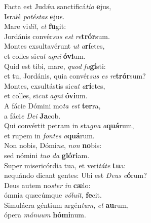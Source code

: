 \evenverse Facta est Judǽa sanctificá\textit{ti}\textit{o} \textbf{e}jus,~\*\\
\evenverse Israël \textit{po}\textit{té}\textit{stas} \textbf{e}jus.\\
\oddverse Mare vi\textit{dit}, \textit{et} \textbf{fu}git:~\*\\
\oddverse Jordánis convér\textit{sus} \textit{est} \textit{re}\textbf{trór}sum.\\
\evenverse Montes exsultavérunt \textit{ut} \textit{a}\textbf{rí}etes,~\*\\
\evenverse et colles si\textit{cut} \textit{a}\textit{gni} \textbf{ó}\textbf{vi}um.\\
\oddverse Quid est tibi, mare, \textit{quod} \textit{fu}\textbf{gí}sti:~\*\\
\oddverse et tu, Jordánis, quia convér\textit{sus} \textit{es} \textit{re}\textbf{trór}sum?\\
\evenverse Montes, exsultástis si\textit{cut} \textit{a}\textbf{rí}etes,~\*\\
\evenverse et colles, si\textit{cut} \textit{a}\textit{gni} \textbf{ó}\textbf{vi}um.\\
\oddverse A fácie Dómini mo\textit{ta} \textit{est} \textbf{ter}ra,~\*\\
\oddverse a fáci\textit{e} \textit{De}\textit{i} \textbf{Ja}cob.\\
\evenverse Qui convértit petram in sta\textit{gna} \textit{a}\textbf{quá}rum,~\*\\
\evenverse et rupem in \textit{fon}\textit{tes} \textit{a}\textbf{quá}rum.\\
\oddverse Non nobis, Dómi\textit{ne}, \textit{non} \textbf{no}bis:~\*\\
\oddverse sed nómini \textit{tu}\textit{o} \textit{da} \textbf{gló}\textbf{ri}am.\\
\evenverse Super misericórdia tua, et veri\textit{tá}\textit{te} \textbf{tu}a:~\*\\
\evenverse nequándo dicant gentes: Ubi est \textit{De}\textit{us} \textit{e}\textbf{ó}rum?\\
\oddverse Deus autem no\textit{ster} \textit{in} \textbf{cæ}lo:~\*\\
\oddverse ómnia quæcúmque \textit{vó}\textit{lu}\textit{it}, \textbf{fe}cit.\\
\evenverse Simulácra géntium argén\textit{tum}, \textit{et} \textbf{au}rum,~\*\\
\evenverse ópera \textit{má}\textit{nu}\textit{um} \textbf{hó}\textbf{mi}num.\\
